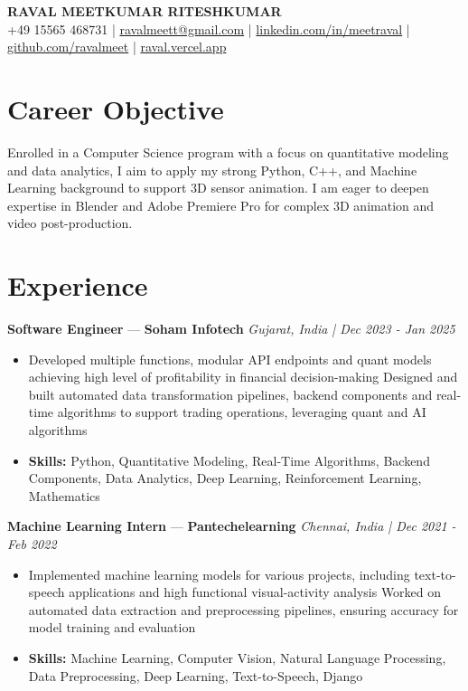 \documentclass[a4paper,10pt]{article}
\begin{document}
\begin{center}
  {\Large\bfseries RAVAL MEETKUMAR RITESHKUMAR}\\[2pt]
  {\small +49 15565 468731 \;|\; \href{mailto:ravalmeett@gmail.com}{ravalmeett@gmail.com} \;|\; \href{https://www.linkedin.com/in/meetraval/}{linkedin.com/in/meetraval} \;|\; \href{https://github.com/ravalmeet}{github.com/ravalmeet} \;|\; \href{https://raval.vercel.app/}{raval.vercel.app}}
\end{center}
\vspace{-3pt}

\section*{Career Objective}
Enrolled in a Computer Science program with a focus on quantitative modeling and data analytics, I aim to apply my strong Python, C++, and Machine Learning background to support 3D sensor animation. I am eager to deepen expertise in Blender and Adobe Premiere Pro for complex 3D animation and video post-production.\par

\section*{Experience}
\textbf{Software Engineer} — \textbf{Soham Infotech} \hfill \textit{Gujarat, India \;|\; Dec 2023 - Jan 2025}\par
\vspace{1pt}
\begin{itemize}
  \item Developed multiple functions, modular API endpoints and quant models achieving high level of profitability in financial decision-making Designed and built automated data transformation pipelines, backend components and real-time algorithms to support trading operations, leveraging quant and AI algorithms
  \item \textbf{Skills:} Python, Quantitative Modeling, Real-Time Algorithms, Backend Components, Data Analytics, Deep Learning, Reinforcement Learning, Mathematics
\end{itemize}
\vspace{3pt}
\textbf{Machine Learning Intern} — \textbf{Pantechelearning} \hfill \textit{Chennai, India \;|\; Dec 2021 - Feb 2022}\par
\vspace{1pt}
\begin{itemize}
  \item Implemented machine learning models for various projects, including text-to-speech applications and high functional visual-activity analysis Worked on automated data extraction and preprocessing pipelines, ensuring accuracy for model training and evaluation
  \item \textbf{Skills:} Machine Learning, Computer Vision, Natural Language Processing, Data Preprocessing, Deep Learning, Text-to-Speech, Django
\end{itemize}
\end{document}
